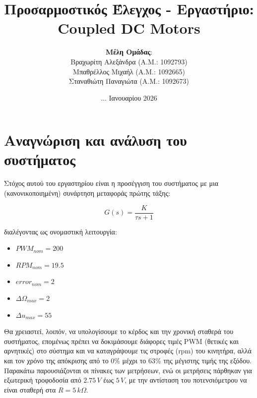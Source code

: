 \documentclass{article}
\title{\textbf{Προσαρμοστικός Έλεγχος - Εργαστήριο:\\Coupled DC Motors}}
\author{\small{\textbf{Μέλη Ομάδας}:} \\ \small{Βραχωρίτη Αλεξάνδρα (A.M.: 1092793)} \\ \small{Μπαθρέλλος Μιχαήλ (Α.Μ.: 1092665)} \\ \small{Σταναθιώτη Παναγιώτα (Α.Μ.: 1092673)}}
\date{\small{... Ιανουαρίου 2026}}
\begin{document}
\maketitle 
    \section{Αναγνώριση και ανάλυση του συστήματος}
    Στόχος αυτού του εργαστηρίου είναι η προσέγγιση του συστήματος με μια (κανονικοποιημένη) συνάρτηση μεταφοράς πρώτης τάξης:
    
    \begin{equation*}
        G(s) = \frac{K}{τs+1}
    \end{equation*}

    \hfill\break
    διαλέγοντας ως ονομαστική λειτουργία: 
    \begin{itemize}
        \item \(PWM_{nom} = 200\)
        \item \(RPM_{nom} = 19.5\)
        \item \(error_{nom} = 2\)
        \item \({\Delta\Omega}_{max} = 2\)
        \item \({\Delta u}_{max} = 55\)
    \end{itemize}
    
    \hfill\break
    Θα χρειαστεί, λοιπόν, να υπολογίσουμε το κέρδος και την χρονική σταθερά του συστήματος, επομένως πρέπει να δοκιμάσουμε διάφορες τιμές PWM (θετικές και αρνητικές) στο σύστημα και να καταγράψουμε τις στροφές (rpm) του κινητήρα, αλλά και τον χρόνο της απόκρισης από το 0\% μέχρι το 63\% της μέγιστης τιμής της εξόδου. Παρακάτω παρουσιάζονται οι πίνακες των μετρήσεων, ενώ οι μετρήσεις πάρθηκαν για εξωτερική τροφοδοσία από \(2.75\,V\) έως \(5\,V\), με την αντίσταση του ποτενσιόμετρου να είναι σταθερή στα \(R = 5\,k\Omega\).
\end{document}
